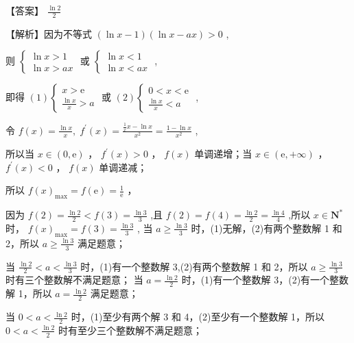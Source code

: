 \documentclass[10pt]{article}
\begin{document}
【答案】 \(\frac{\ln 2}{2}\)

【解析】因为不等式 \(\left( {\ln x - 1}\right) \left( {\ln x - {ax}}\right)  > 0\) ,

则 \(\left\{  \begin{array}{l} \ln x > 1 \\  \ln x > {ax} \end{array}\right.\) 或 \(\left\{  \begin{array}{l} \ln x < 1 \\  \ln x < {ax} \end{array}\right.\) ,

即得 \(\left( 1\right) \left\{  {\begin{array}{l} x > \mathrm{e} \\  \frac{\ln x}{x} > a \end{array}\text{ 或 }\left( 2\right) \left\{  \begin{array}{l} 0 < x < \mathrm{e} \\  \frac{\ln x}{x} < a \end{array}\right. }\right.\) ,

令 \(f\left( x\right)  = \frac{\ln x}{x},\;{f}^{\prime }\left( x\right)  = \frac{\frac{1}{x}x - \ln x}{{x}^{2}} = \frac{1 - \ln x}{{x}^{2}}\) ,

所以当 \(x \in  \left( {0,\mathrm{e}}\right)\) ， \({f}^{\prime }\left( x\right)  > 0\) ， \(f\left( x\right)\) 单调递增；当 \(x \in  \left( {\mathrm{e}, + \infty }\right)\) ， \({f}^{\prime }\left( x\right)  < 0\) ， \(f\left( x\right)\) 单调递减；

所以 \(f{\left( x\right) }_{\max } = f\left( \mathrm{e}\right)  = \frac{1}{\mathrm{e}}\) ，

因为 \(f\left( 2\right)  = \frac{\ln 2}{2} < f\left( 3\right)  = \frac{\ln 3}{3}\) ,且 \(f\left( 2\right)  = f\left( 4\right)  = \frac{\ln 2}{2} = \frac{\ln 4}{4}\) ,所以 \(x \in  {\mathbf{N}}^{ * }\) 时， \(f{\left( x\right) }_{\max } = f\left( 3\right)  = \frac{\ln 3}{3}\) , 当 \(a \geq  \frac{\ln 3}{3}\) 时，(1)无解，(2)有两个整数解 1 和 2，所以 \(a \geq  \frac{\ln 3}{3}\) 满足题意；

当 \(\frac{\ln 2}{2} < a < \frac{\ln 3}{3}\) 时，(1)有一个整数解 3,(2)有两个整数解 1 和 2，所以 \(a \geq  \frac{\ln 3}{3}\) 时有三个整数解不满足题意； 当 \(a = \frac{\ln 2}{2}\) 时，(1)有一个整数解 3，(2)有一个整数解 1，所以 \(a = \frac{\ln 2}{2}\) 满足题意；

当 \(0 < a < \frac{\ln 2}{2}\) 时，(1)至少有两个解 3 和 4，(2)至少有一个整数解 1，所以 \(0 < a < \frac{\ln 2}{2}\) 时有至少三个整数解不满足题意；
\end{document}

